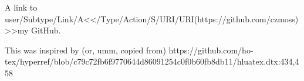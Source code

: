 A link to
\pdfstartlink user{/Subtype/Link/A<</Type/Action/S/URI/URI(https://github.com/czmoss)>>}my GitHub\pdfendlink.
\bye

This was inspired by (or, umm, copied from)
https://github.com/ho-tex/hyperref/blob/c79c72fb6f9770644d86091254c0f0b60fb8db11/hluatex.dtx:434,458
